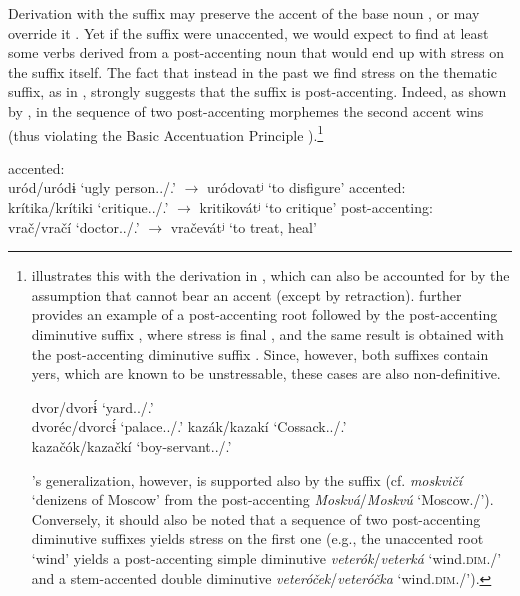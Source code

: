\documentclass[output=paper,colorlinks,citecolor=black,koreanfont]{langscibook}
\begin{document}
\noindent Derivation with the suffix  may preserve the accent of the base noun , or may override it . Yet if the suffix  were unaccented, we would expect to find at least some verbs derived from a post-accenting noun that would end up with stress on the suffix itself. The fact that instead in the past we find stress on the thematic suffix, as in , strongly suggests that the suffix  is post-accenting. Indeed, as shown by \citet[126]{Garde1998}, in the sequence of two post-accenting morphemes the second accent wins (thus violating the Basic Accentuation Principle ).\footnote{\label{mat:fn:Garde}\citet[126]{Garde1998} illustrates this with the derivation in , which can also be accounted for by the assumption that  
cannot bear an accent (except by retraction). \citet[131]{Garde1998} further provides an example of a post-accenting root followed by the post-accenting diminutive suffix , where stress is final , and the same result is obtained with the post-accenting diminutive suffix  . Since, however, both suffixes contain yers, which are known to be unstressable, these cases are also non-definitive.

\ea
\ea\label{mat:ex:GardeDvor} dvor/dvorɨ́ ‘yard.{\SG.\NOM}/{\PL.\NOM}’\\ dvoréc/dvorcɨ́ ‘palace.{\SG.\NOM}/{\PL.\NOM}’ 
\ex\label{mat:ex:GardeKazak} kazák/kazakí ‘Cossack.{\SG.\NOM}/{\PL.\NOM}’ \\kazačók/kazačkí ‘boy-servant.{\SG.\NOM}/{\PL.\NOM}’
\z
\z

\noindent \citeauthor{Garde1998}’s generalization, however, is supported also by the suffix  (cf. \textit{moskvičí} ‘denizens of Moscow’ from the post-accenting \textit{Moskvá}/\textit{Moskvú} ‘Moscow.{\NOM/\ACC}’). Conversely, it should also be noted that a sequence of two post-accenting diminutive suffixes  yields stress on the first one (e.g., the unaccented root  ‘wind’ yields a post-accenting simple diminutive \textit{veterók}/\textit{veterká} ‘wind.{\textsc{dim}.\NOM}/{\GEN}’ and a stem-accented double diminutive \textit{veteróček}/\textit{veteróčka} ‘wind.{\textsc{dim}.\NOM}/{\GEN}’). }

\ea\label{mat:ex:TwoPostAccenting}
\ea\label{mat:ex:urodovat} accented: \\
uród/uródɨ ‘ugly person.{\SG.\NOM}/{\PL.\NOM}’ $\rightarrow$ uródovatʲ ‘to disfigure’
\ex\label{mat:ex:kritikovatAgain} accented:\\
krítika/krítiki ‘critique.{\SG.\NOM}/{\PL.\NOM}’ $\rightarrow$ kritikovátʲ ‘to critique’
\ex\label{mat:ex:vracevatAgain} post-accenting:\\
vrač/vračí ‘doctor.{\SG.\NOM}/{\PL.\NOM}’ $\rightarrow$ vračevátʲ ‘to treat, heal’
\z
\z
\end{document}
